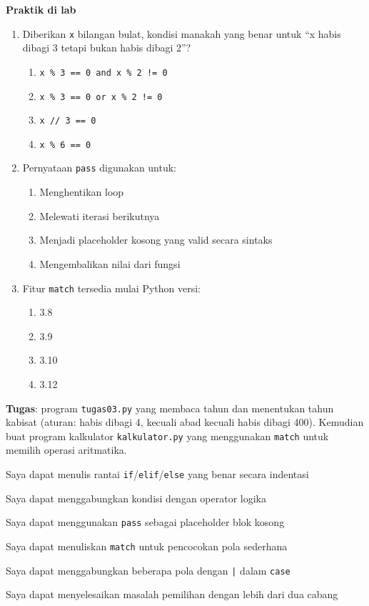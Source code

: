﻿\documentclass[../main.tex]{subfiles}
\begin{document}
\begin{asesmen}
\textbf{Praktik di lab}

\begin{enumerate}
  \item Diberikan \texttt{x} bilangan bulat, kondisi manakah yang benar untuk ``x habis dibagi 3 tetapi bukan habis dibagi 2''?
  \begin{enumerate}
    \item \texttt{x \% 3 == 0 and x \% 2 != 0}
    \item \texttt{x \% 3 == 0 or x \% 2 != 0}
    \item \texttt{x // 3 == 0}
    \item \texttt{x \% 6 == 0}
  \end{enumerate}
  \item Pernyataan \texttt{pass} digunakan untuk:
  \begin{enumerate}
    \item Menghentikan loop
    \item Melewati iterasi berikutnya
    \item Menjadi placeholder kosong yang valid secara sintaks
    \item Mengembalikan nilai dari fungsi
  \end{enumerate}
  \item Fitur \texttt{match} tersedia mulai Python versi:
  \begin{enumerate}
    \item 3.8
    \item 3.9
    \item 3.10
    \item 3.12
  \end{enumerate}
\end{enumerate}

\textbf{Tugas}: program \texttt{tugas03.py} yang membaca tahun dan menentukan tahun kabisat (aturan: habis dibagi 4, kecuali abad kecuali habis dibagi 400). Kemudian buat program kalkulator \texttt{kalkulator.py} yang menggunakan \texttt{match} untuk memilih operasi aritmatika.
\end{asesmen}

\begin{checklist}
  \item Saya dapat menulis rantai \texttt{if}/\texttt{elif}/\texttt{else} yang benar secara indentasi
  \item Saya dapat menggabungkan kondisi dengan operator logika
  \item Saya dapat menggunakan \texttt{pass} sebagai placeholder blok kosong
  \item Saya dapat menuliskan \texttt{match} untuk pencocokan pola sederhana
  \item Saya dapat menggabungkan beberapa pola dengan \texttt{|} dalam \texttt{case}
  \item Saya dapat menyelesaikan masalah pemilihan dengan lebih dari dua cabang
\end{checklist}
\end{document}
